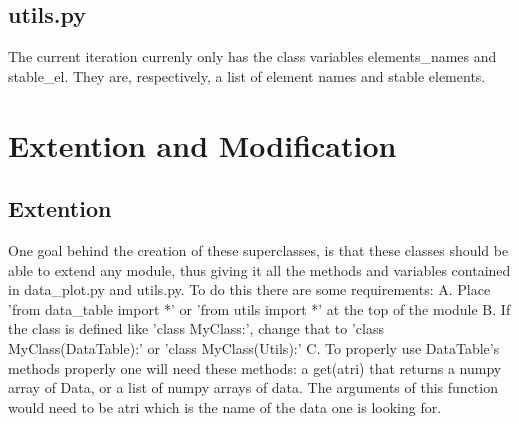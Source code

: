 \subsection{utils.py}
The current iteration currenly only has the class variables elements\_names and stable\_el.
They are, respectively, a list of element names and stable elements.

\section{Extention and Modification}

\subsection{Extention}

One goal behind the creation of these superclasses, is that these classes should be able to extend any module, thus giving it all the methods and variables contained in 
data\_plot.py and utils.py.  To do this there are some requirements:\newline
A. Place 'from data\_table import *' or 'from utils import *' at the top of the module\newline
B. If the class is defined like 'class MyClass:', change that to 
   'class MyClass(DataTable):' or 'class MyClass(Utils):'\newline
C. To properly use DataTable's methods properly one will need these methods:
	a get(atri) that returns a numpy array of Data, or a 
	list of numpy arrays of data.  The arguments of this function would need to be
	atri which is the name of the data one is looking for.\newline\newline

